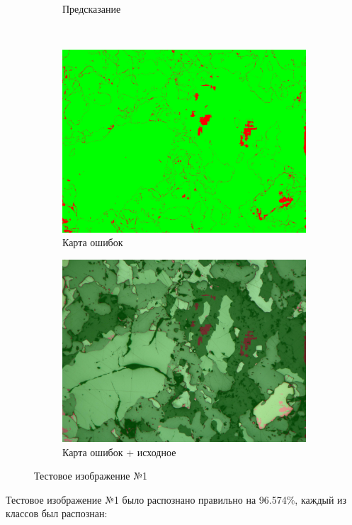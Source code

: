\begin{figure}[H]
\begin{subfigure}{.33\textwidth}
  \caption{Предсказание}
  \label{fig:sfig1_3}
\end{subfigure} \\
\centering
\begin{subfigure}{.33\textwidth}
  \centering
  \includegraphics[width=.9\linewidth]{pics/image_3_error.jpg}
  \caption{Карта ошибок}
  \label{fig:sfig1_4}
\end{subfigure}%
\begin{subfigure}{.33\textwidth}
  \centering
  \includegraphics[width=.9\linewidth]{pics/image_3_overlay.jpg}
  \caption{Карта ошибок + исходное}
  \label{fig:sfig1_5}
\end{subfigure}
\caption{Тестовое изображение №1}
\label{fig:pred1}
\end{figure}
Тестовое изображение №1 было распознано правильно на 96.574\%, каждый из классов был распознан: \\
